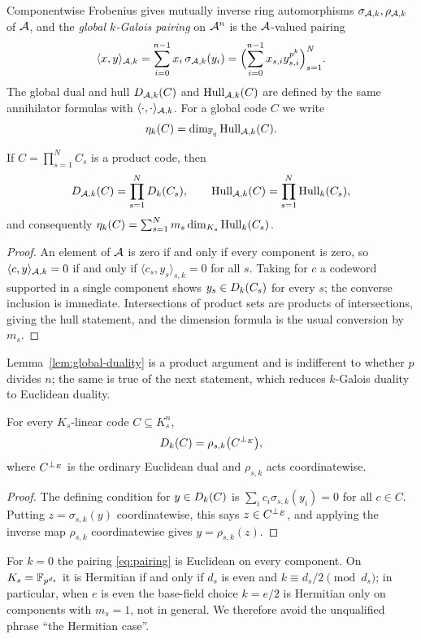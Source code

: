 Componentwise Frobenius gives mutually inverse ring automorphisms
$\sigma_{\mathcal A,k},\rho_{\mathcal A,k}$ of $\mathcal A$, and the \emph{global $k$-Galois pairing} on
$\mathcal A^n$ is the $\mathcal A$-valued pairing
\[
\langle x,y\rangle_{\mathcal A,k}
   =\sum_{i=0}^{n-1}x_i\,\sigma_{\mathcal A,k}(y_i)
   =\Bigl(\sum_{i=0}^{n-1}x_{s,i}y_{s,i}^{p^k}\Bigr)_{s=1}^{N}.
\]
The global dual and hull $D_{\mathcal A,k}(C)$ and $\operatorname{Hull}_{\mathcal A,k}(C)$ are defined by the
same annihilator formulas with $\langle\cdot,\cdot\rangle_{\mathcal A,k}$.  For a
global code $C$ we write
\[
\eta_k(C)=\dim_{\mathbb F_q}\operatorname{Hull}_{\mathcal A,k}(C).
\]

\begin{lemma}\label{lem:global-duality}
If $C=\prod_{s=1}^{N}C_s$ is a product code, then
\[
D_{\mathcal A,k}(C)=\prod_{s=1}^{N}D_k(C_s),
\qquad
\operatorname{Hull}_{\mathcal A,k}(C)=\prod_{s=1}^{N}\operatorname{Hull}_k(C_s),
\]
and consequently
$\eta_k(C)=\sum_{s=1}^{N}m_s\dim_{K_s}\operatorname{Hull}_k(C_s)$.
\end{lemma}

\begin{proof}
An element of $\mathcal A$ is zero if and only if every component is zero, so
$\langle c,y\rangle_{\mathcal A,k}=0$ if and only if
$\langle c_s,y_s\rangle_{s,k}=0$ for all $s$.  Taking for $c$ a codeword
supported in a single component shows $y_s\in D_k(C_s)$ for every $s$; the
converse inclusion is immediate.  Intersections of product sets are products of
intersections, giving the hull statement, and the dimension formula is the
usual conversion by $m_s$.
\end{proof}

Lemma~\ref{lem:global-duality} is a product argument and is indifferent to
whether $p$ divides $n$; the same is true of the next statement, which reduces
$k$-Galois duality to Euclidean duality.

\begin{proposition}\label{prop:dual-translation}
For every $K_s$-linear code $C\subseteq K_s^n$,
\[
D_k(C)=\rho_{s,k}\bigl(C^{\perp_{E}}\bigr),
\]
where $C^{\perp_{E}}$ is the ordinary Euclidean dual and $\rho_{s,k}$ acts
coordinatewise.
\end{proposition}

\begin{proof}
The defining condition for $y\in D_k(C)$ is
$\sum_i c_i\sigma_{s,k}(y_i)=0$ for all $c\in C$.  Putting
$z=\sigma_{s,k}(y)$ coordinatewise, this says $z\in C^{\perp_{E}}$, and applying
the inverse map $\rho_{s,k}$ coordinatewise gives $y=\rho_{s,k}(z)$.
\end{proof}

\begin{remark}\label{rem:euclidean-hermitian}
For $k=0$ the pairing \eqref{eq:pairing} is Euclidean on every component.  On
$K_s=\mathbb F_{p^{d_s}}$ it is Hermitian if and only if $d_s$ is even and
$k\equiv d_s/2\pmod{d_s}$; in particular, when $e$ is even the base-field
choice $k=e/2$ is Hermitian only on components with $m_s=1$, not in general.
We therefore avoid the unqualified phrase ``the Hermitian case''.
\end{remark}

